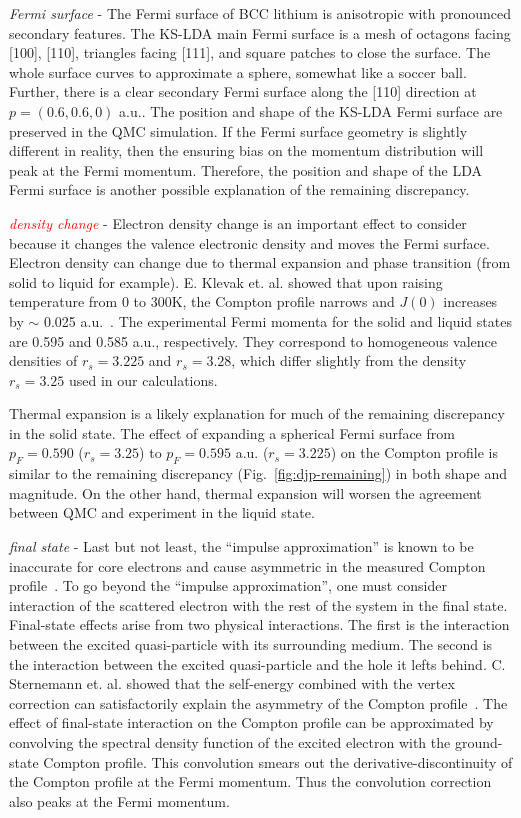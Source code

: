 \documentclass[aps,prb,showpacs,preprintnumbers,amsmath,amssymb,superscriptaddress,twocolumn]{revtex4}
\begin{document}
\emph{Fermi surface} - The Fermi surface of BCC lithium is anisotropic with pronounced secondary features. The KS-LDA main Fermi surface is a mesh of octagons facing [100], [110], triangles facing [111], and square patches to close the surface. The whole surface curves to approximate a sphere, somewhat like a soccer ball. Further, there is a clear secondary Fermi surface along the [110] direction at $p=(0.6, 0.6, 0)$ a.u.. The position and shape of the KS-LDA Fermi surface are preserved in the QMC simulation. If the Fermi surface geometry is slightly different in reality, then the ensuring bias on the momentum distribution will peak at the Fermi momentum. Therefore, the position and shape of the LDA Fermi surface is another possible explanation of the remaining discrepancy.

\emph{\textcolor{red}{density change}} - Electron density change is an important effect to consider because it changes the valence electronic density and moves the Fermi surface. Electron density can change due to thermal expansion and phase transition (from solid to liquid for example). E. Klevak et. al. showed that upon raising temperature from 0 to 300K, the Compton profile narrows and $J(0)$ increases by $\sim$ 0.025 a.u.~\cite{Klevak2016}. The experimental Fermi momenta for the solid and liquid states are 0.595 and 0.585 a.u., respectively. They correspond to homogeneous valence densities of $r_s=3.225$ and $r_s=3.28$, which differ slightly from the density $r_s=3.25$ used in our calculations.

Thermal expansion is a likely explanation for much of the remaining discrepancy in the solid state. The effect of expanding a spherical Fermi surface from $p_F=0.590$ ($r_s=3.25$) to $p_F=0.595$ a.u. ($r_s=3.225$) on the Compton profile is similar to the remaining discrepancy (Fig.~\ref{fig:djp-remaining}) in both shape and magnitude. On the other hand, thermal expansion will worsen the agreement between QMC and experiment in the liquid state.

\emph{final state} - Last but not least, the ``impulse approximation'' is known to be inaccurate for core electrons and cause asymmetric in the measured Compton profile~\cite{Eisenberger1970,Sternemann2000,Huotari2001}. To go beyond the ``impulse approximation'', one must consider interaction of the scattered electron with the rest of the system in the final state. Final-state effects arise from two physical interactions. The first is the interaction between the excited quasi-particle with its surrounding medium. The second is the interaction between the excited quasi-particle and the hole it lefts behind. C. Sternemann et. al. showed that the self-energy combined with the vertex correction can satisfactorily explain the asymmetry of the Compton profile~\cite{Sternemann2000}. The effect of final-state interaction on the Compton profile can be approximated by convolving the spectral density function of the excited electron with the ground-state Compton profile. This convolution smears out the derivative-discontinuity of the Compton profile at the Fermi momentum. Thus the convolution correction also peaks at the Fermi momentum.
\end{document}
